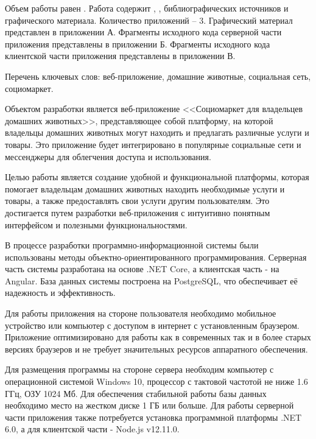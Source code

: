 
Объем работы равен . Работа содержит , ,  библиографических источников и  графического материала. Количество приложений – 3. Графический материал представлен в приложении А. Фрагменты исходного кода серверной части приложения представлены в приложении Б. Фрагменты исходного кода клиентской части приложения представлены в приложении В.

Перечень ключевых слов: веб-приложение, домашние животные, социальная сеть, социомаркет.

Объектом разработки является веб-приложение <<Социомаркет для владельцев домашних животных>>, представляющее собой платформу, на которой владельцы домашних животных могут находить и предлагать различные услуги и товары. Это приложение будет интегрировано в популярные социальные сети и мессенджеры для облегчения доступа и использования.

Целью работы является создание удобной и функциональной платформы, которая помогает владельцам домашних животных находить необходимые услуги и товары, а также предоставлять свои услуги другим пользователям. Это достигается путем разработки веб-приложения с интуитивно понятным интерфейсом и полезными функциональностями.

В процессе разработки программно-информационной системы были использованы методы объектно-ориентированного программирования. Серверная часть системы разработана на основе .NET Core, а клиентская часть -\- на Angular. База данных системы построена на PostgreSQL, что обеспечивает её надежность и эффективность.

Для работы приложения на стороне пользователя необходимо мобильное устройство или компьютер с доступом в интернет с установленным браузером. Приложение оптимизировано для работы как в современных так и в более старых версиях браузеров и не требует значительных ресурсов аппаратного обеспечения.

Для размещения программы на стороне сервера необходим компьютер с операционной системой Windows 10, процессор с тактовой частотой не ниже 1.6 ГГц, ОЗУ 1024 Мб. Для обеспечения стабильной работы базы данных необходимо место на жестком диске 1 ГБ или больше. Для работы серверной части приложения также потребуется установка программной платформы .NET 6.0, а для клиентской части -\- Node.js v12.11.0.

